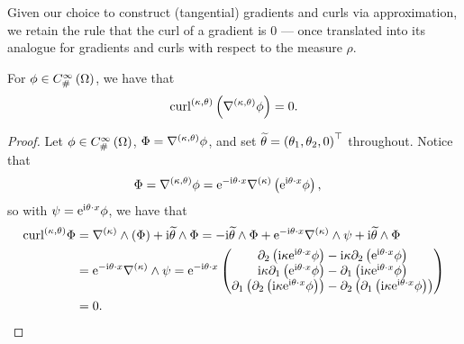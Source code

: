 Given our choice to construct (tangential) gradients and curls via approximation, we retain the rule that the curl of a gradient is 0 --- once translated into its analogue for gradients and curls with respect to the measure $\rho$.
\begin{lemma} \label{lem:CurlOfGradSmoothFunctions}
	For $\phi\in C^{\infty}_{\#}\left( \Omega \right)$, we have that
	\begin{align*}
		\mathrm{curl}_{}^{\left( \kappa, \theta \right)}\left( \nabla^{\left( \kappa, \theta \right)}\phi \right) = 0.
	\end{align*}
\end{lemma}
\begin{proof}
	Let $\phi\in C^{\infty}_{\#}\left( \Omega \right)$, $\Phi = \nabla^{\left( \kappa, \theta \right)}\phi$, and set $\widetilde{\theta} = \left( \theta_1, \theta_2, 0 \right)^\top$ throughout.
	Notice that
	\begin{align*}
		\Phi = \nabla^{\left( \kappa, \theta \right)}\phi &= \mathrm{e}^{-\mathrm{i}\theta\cdot x}\nabla^{(\kappa)}\left(  \mathrm{e}^{\mathrm{i}\theta\cdot x}\phi  \right),
	\end{align*}
	so with $\psi = \mathrm{e}^{\mathrm{i}\theta\cdot x}\phi$, we have that
	\begin{align*}
		\mathrm{curl}_{}^{\left( \kappa, \theta \right)}\Phi 
		&= \nabla^{(\kappa)}\wedge\left(  \Phi  \right) + \mathrm{i}\widetilde{\theta}\wedge\Phi
		= -\mathrm{i}\widetilde{\theta}\wedge\Phi + \mathrm{e}^{-\mathrm{i}\theta\cdot x}\nabla^{(\kappa)}\wedge\psi + \mathrm{i}\widetilde{\theta}\wedge\Phi \\
		&= \mathrm{e}^{-\mathrm{i}\theta\cdot x}\nabla^{(\kappa)}\wedge\psi
		= \mathrm{e}^{-\mathrm{i}\theta\cdot x} 
		\begin{pmatrix}
			\partial_2\left(  \mathrm{i}\kappa \mathrm{e}^{\mathrm{i}\theta\cdot x}\phi  \right) - \mathrm{i}\kappa\partial_2\left(  \mathrm{e}^{\mathrm{i}\theta\cdot x}\phi  \right) \\
			\mathrm{i}\kappa\partial_1\left(  \mathrm{e}^{\mathrm{i}\theta\cdot x}\phi  \right) - \partial_1\left(  \mathrm{i}\kappa \mathrm{e}^{\mathrm{i}\theta\cdot x}\phi  \right) \\
			\partial_1\left(  \partial_2\left( \mathrm{i}\kappa\mathrm{e}^{\mathrm{i}\theta\cdot x}\phi \right)  \right) - \partial_2\left(  \partial_1\left( \mathrm{i}\kappa\mathrm{e}^{\mathrm{i}\theta\cdot x}\phi \right)  \right)
		\end{pmatrix} \\
		&= 0.
	\end{align*}
\end{proof}

